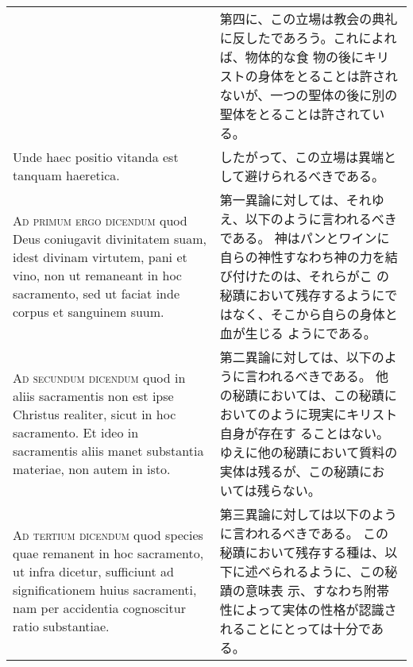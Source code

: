 \documentclass[10pt]{jsarticle} %
\begin{document}
\begin{longtable}{p{21em}p{21em}}
&

第四に、この立場は教会の典礼に反したであろう。これによれば、物体的な食
 物の後にキリストの身体をとることは許されないが、一つの聖体の後に別の
 聖体をとることは許されている。

\\



Unde haec positio
vitanda est tanquam haeretica.

&

したがって、この立場は異端として避けられるべきである。

\\



{\scshape Ad primum ergo dicendum} quod Deus coniugavit divinitatem suam, idest
divinam virtutem, pani et vino, non ut remaneant in hoc sacramento,
sed ut faciat inde corpus et sanguinem suum.

&

第一異論に対しては、それゆえ、以下のように言われるべきである。
神はパンとワインに自らの神性すなわち神の力を結び付けたのは、それらがこ
 の秘蹟において残存するようにではなく、そこから自らの身体と血が生じる
 ようにである。


\\



{\scshape Ad secundum dicendum} quod in aliis sacramentis non est ipse Christus
realiter, sicut in hoc sacramento. Et ideo in sacramentis aliis manet
substantia materiae, non autem in isto.

&

第二異論に対しては、以下のように言われるべきである。
他の秘蹟においては、この秘蹟においてのように現実にキリスト自身が存在す
 ることはない。ゆえに他の秘蹟において質料の実体は残るが、この秘蹟にお
 いては残らない。

\\



{\scshape Ad tertium dicendum} quod species quae remanent in hoc sacramento, ut
infra dicetur, sufficiunt ad significationem huius sacramenti, nam per
accidentia cognoscitur ratio substantiae.

&

第三異論に対しては以下のように言われるべきである。
この秘蹟において残存する種は、以下に述べられるように、この秘蹟の意味表
 示、すなわち附帯性によって実体の性格が認識されることにとっては十分である。

\\


\end{longtable}
\newpage
\end{document}

